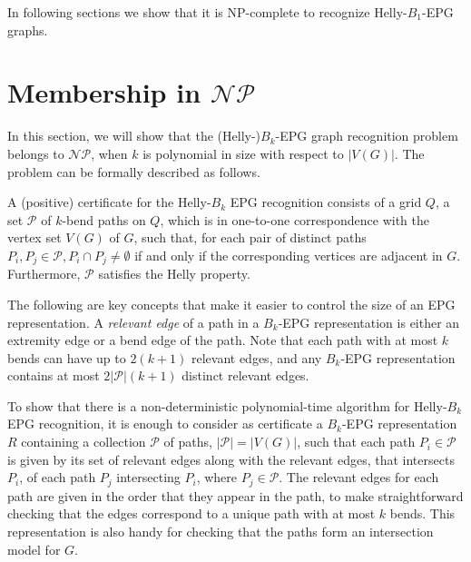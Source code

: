 In following sections we show that it is NP-complete to recognize Helly-$B_1$-EPG graphs.


\section{Membership in $\mathcal{NP}$} \label{sec:NPpert}

In this section, we will show that the (Helly-)$B_k$-EPG graph recognition problem belongs to $\mathcal{NP}$, when $k$ is polynomial in size with respect to $ |V(G)|$. The problem can be formally described as follows.



A (positive) certificate for the {\sc Helly-$B_k$ EPG recognition} consists of a grid $Q$, a set $\mathcal{P}$ of $k$-bend paths on $Q$, which is in one-to-one correspondence with the vertex set $V(G)$ of $G$, such that, for each pair of distinct paths $P_i, P_j\in \mathcal{P}, P_i\cap P_j \neq \emptyset $ if and only if the corresponding vertices are adjacent in $G$. Furthermore, $\mathcal{P}$ satisfies the Helly property.


The following are key concepts that make it easier to control the size of an EPG representation. A \emph{relevant edge} of a path in a $B_k$-EPG representation is either an extremity edge or a bend edge of the path. Note that each path with at most $k$ bends can have up to $2(k + 1)$ relevant edges, and any $B_k$-EPG representation contains at most $2|\mathcal{P}|(k + 1)$ distinct relevant edges. 


To show that there is a non-deterministic polynomial-time algorithm for {\sc Helly-$B_k$ EPG recognition}, it is enough to consider as certificate a  $B_k$-EPG representation $R$ containing a collection $\mathcal{P}$ of paths, $|\mathcal{P}| = |V(G)|$, such that  each path $P_i \in \mathcal{P}$ is given by its set of relevant edges along with the relevant edges, that intersects $P_i$, of each path $P_j$ intersecting $P_i$, where $P_j \in \mathcal{P}$.  The relevant edges for each path are given in the order that they appear in the path, to make straightforward checking that the edges correspond to a unique path with at most $k$ bends.  This representation is also handy for checking that the paths form an intersection model for $G$.

